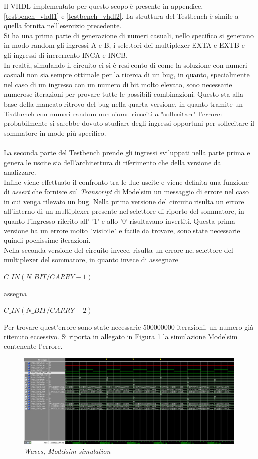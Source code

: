 Il VHDL implementato per questo scopo è presente in appendice, \ref{testbench_vhdl1} e \ref{testbench_vhdl2}.
\newpage
\noindent La struttura del Testbench è simile a quella fornita nell'esercizio precedente.\\
Si ha una prima parte di generazione di numeri casuali, nello specifico si generano in modo random gli ingressi A e B, i selettori dei multiplexer EXTA e EXTB e gli ingressi di incremento INCA e INCB.\\
In realtà, simulando il circuito ci si è resi conto di come la soluzione con numeri casuali non sia sempre ottimale per la ricerca di un bug, in quanto, specialmente nel caso di un ingresso con un numero di bit molto elevato, sono necessarie numerose iterazioni per provare tutte le possibili combinazioni. Questo sta alla base della mancato ritrovo del bug nella quarta versione, in quanto tramite un Testbench con numeri random non siamo riusciti a "sollecitare" l'errore: probabilmente si sarebbe dovuto studiare degli ingressi opportuni per sollecitare il sommatore in modo più specifico.\\
\\
La seconda parte del Testbench prende gli ingressi sviluppati nella parte prima e genera le uscite sia dell'architettura di riferimento che della versione da analizzare.\\
Infine viene effettuato il confronto tra le due uscite e viene definita una funzione di \textit{assert} che fornisce sul \textit{Transcript} di Modelsim un messaggio di errore nel caso in cui venga rilevato un bug.
Nella prima versione del circuito risulta un errore all'interno di un multiplexer presente nel selettore di riporto del sommatore, in quanto l'ingresso riferito all' '1' e allo '0' risultavano invertiti. Questa prima versione ha un errore molto "visibile" e facile da trovare, sono state necessarie quindi pochissime iterazioni.\\
Nella seconda versione del circuito invece, risulta un errore nel selettore del multiplexer del sommatore, in quanto invece di assegnare
\begin{center}
	$C\_IN(N\_BIT/CARRY-1)$
\end{center} 
assegna 
\begin{center}
	$C\_IN(N\_BIT/CARRY-2)$
\end{center}
Per trovare quest'errore sono state necessarie 500000000 iterazioni, un numero già ritenuto eccessivo. Si riporta in allegato in Figura \ref{sim1} la simulazione Modelsim contenente l'errore.
\begin{figure}[!htb]
	\centering
	\includegraphics[scale=0.6]{immagini/sim1}
	\caption{\textit{Waves, Modelsim simulation}}
	\label{sim1}
\end{figure}
